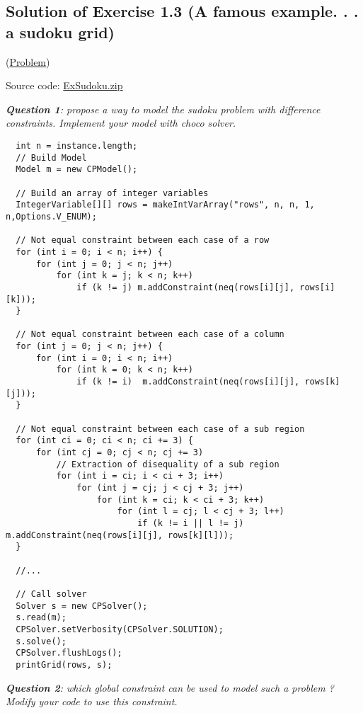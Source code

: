 \subsection{Solution of Exercise 1.3 (A famous example. . . a sudoku grid)}\label{solutions:solutionofexercise1.3}\hypertarget{solutions:solutionofexercise1.3}{}

(\hyperlink{exercises:exercise1.3}{Problem})

Source code: \href{media/zip/exsudoku.zip}{ExSudoku.zip}

\noindent\emph{\textbf{Question 1}: propose a way to model the sudoku problem with difference constraints. Implement your model with choco solver.}

\begin{lstlisting}
  int n = instance.length;
  // Build Model
  Model m = new CPModel();
  
  // Build an array of integer variables
  IntegerVariable[][] rows = makeIntVarArray("rows", n, n, 1, n,Options.V_ENUM);
	
  // Not equal constraint between each case of a row
  for (int i = 0; i < n; i++) {
      for (int j = 0; j < n; j++)
          for (int k = j; k < n; k++)
              if (k != j) m.addConstraint(neq(rows[i][j], rows[i][k]));
  }
                  
  // Not equal constraint between each case of a column
  for (int j = 0; j < n; j++) {
      for (int i = 0; i < n; i++)
          for (int k = 0; k < n; k++)
              if (k != i)  m.addConstraint(neq(rows[i][j], rows[k][j]));
  }

  // Not equal constraint between each case of a sub region
  for (int ci = 0; ci < n; ci += 3) {
      for (int cj = 0; cj < n; cj += 3)
          // Extraction of disequality of a sub region
          for (int i = ci; i < ci + 3; i++)
              for (int j = cj; j < cj + 3; j++)
                  for (int k = ci; k < ci + 3; k++)
                      for (int l = cj; l < cj + 3; l++)
                          if (k != i || l != j) m.addConstraint(neq(rows[i][j], rows[k][l]));
  }
	
  //...
	
  // Call solver
  Solver s = new CPSolver();
  s.read(m);
  CPSolver.setVerbosity(CPSolver.SOLUTION);
  s.solve();
  CPSolver.flushLogs();
  printGrid(rows, s);
\end{lstlisting}

\noindent\emph{\textbf{Question 2}: which global constraint can be used to model such a problem ? Modify your code to use this constraint.}


